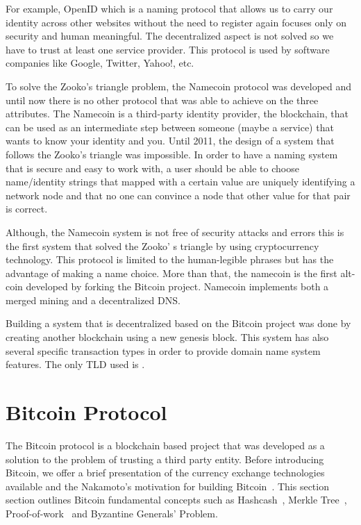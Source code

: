 For example, OpenID which is a naming protocol that allows us to carry our identity across other websites without the need to register again focuses only on security and human meaningful. The decentralized aspect is not solved so we have to trust at least one service provider. This protocol is used by software companies like Google, Twitter, Yahoo!, etc. 

To solve the Zooko’s triangle problem, the Namecoin protocol was developed and until now there is no other protocol that was able to achieve on the three attributes. The Namecoin is a third-party identity provider, the blockchain, that can be used as an intermediate step between someone (maybe a service) that wants to know your identity and you. 
Until 2011, the design of a system that follows the Zooko’s triangle was impossible.
In order to have a naming system that is secure and easy to work with, a user should be able to choose name/identity strings that mapped with a certain value are uniquely identifying a network node  and that no one can convince a node that other value for that pair is correct.

Although, the Namecoin system is not free of security attacks and errors this is the first system that solved the Zooko’ s triangle by using cryptocurrency technology. This protocol is limited to the human-legible phrases but has the advantage of making a name choice.
More than that, the namecoin is the first alt-coin developed by forking the Bitcoin project. Namecoin implements both a merged mining and a decentralized DNS.

Building a system that is decentralized based on the Bitcoin project was done by creating another blockchain using a new genesis block. This system has also several specific transaction types in order to provide domain name system features.
The only TLD used is .

\section{Bitcoin Protocol}
\label{sec:bitcoinprotocol-lbl}
The Bitcoin protocol is a blockchain based project that was developed as a solution to the problem of trusting a third party entity. Before introducing Bitcoin, we offer a brief presentation of the currency exchange technologies available and the Nakamoto's motivation for building Bitcoin~\cite{bitcoinwhitepaper}.
This section section outlines Bitcoin fundamental concepts such as Hashcash~\cite{hashcash}, Merkle Tree~\cite{merkletree}, Proof-of-work~\cite{proofofwork} and Byzantine Generals' Problem\cite{byzantine}.
